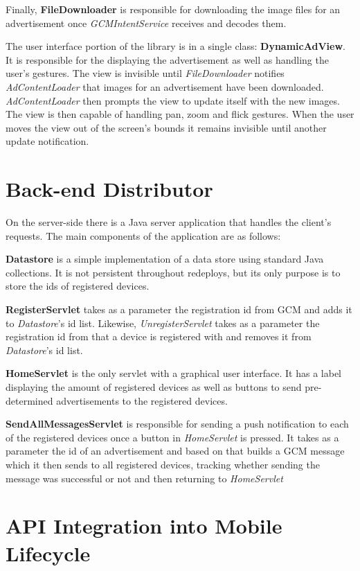 Finally, \textbf{FileDownloader} is responsible for downloading the image files for an advertisement once \textit{GCMIntentService} receives and decodes them.

The user interface portion of the library is in a single class: \textbf{DynamicAdView}. It is responsible for the displaying the advertisement as well as handling the user's gestures. The view is invisible until \textit{FileDownloader} notifies \textit{AdContentLoader} that images for an advertisement have been downloaded. \textit{AdContentLoader} then prompts the view to update itself with the new images. The view is then capable of handling pan, zoom and flick gestures. When the user moves the view out of the screen's bounds it remains invisible until another update notification.

\section{Back-end Distributor}

On the server-side there is a Java server application that handles the client's requests. The main components of the application are as follows:

\textbf{Datastore} is a simple implementation of a data store using standard Java collections. It is not persistent throughout redeploys, but its only purpose is to store the ids of registered devices.

\textbf{RegisterServlet} takes as a parameter the registration id from GCM and adds it to \textit{Datastore}'s id list. Likewise, \textit{UnregisterServlet} takes as a parameter the registration id from that a device is registered with and removes it from \textit{Datastore}'s id list.

\textbf{HomeServlet} is the only servlet with a graphical user interface. It has a label displaying the amount of registered devices as well as buttons to send pre-determined advertisements to the registered devices.

\textbf{SendAllMessagesServlet} is responsible for sending a push notification to each of the registered devices once a button in \textit{HomeServlet} is pressed. It takes as a parameter the id of an advertisement and based on that builds a GCM message which it then sends to all registered devices, tracking whether sending the message was successful or not and then returning to \textit{HomeServlet}

\section{API Integration into Mobile Lifecycle}

